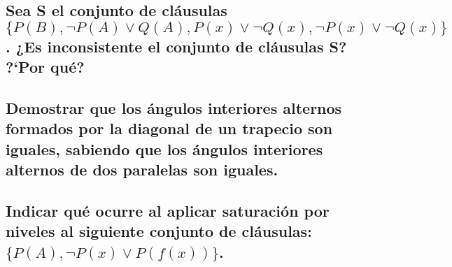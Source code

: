 \documentclass[10pt, a4paper,spanish]{article}
\begin{document}
		\subsection{Sea S el conjunto de cláusulas $ \{ P(B), \lnot P(A) \lor Q(A), P(x) \lor \lnot Q(x), \lnot P(x) \lor \lnot Q(x) \} $. ¿Es inconsistente el conjunto de cláusulas S? ?`Por qué?}

			\paragraph{}


		\subsection{Demostrar que los ángulos interiores alternos formados por la diagonal de un trapecio son iguales, sabiendo que los ángulos interiores alternos de dos paralelas son iguales.}

			\paragraph{}


		\subsection{Indicar qué ocurre al aplicar saturación por niveles al siguiente conjunto de cláusulas: $ \{ P(A), \lnot P(x) \lor P(f(x)) \} $.}

			\paragraph{}
\end{document}
